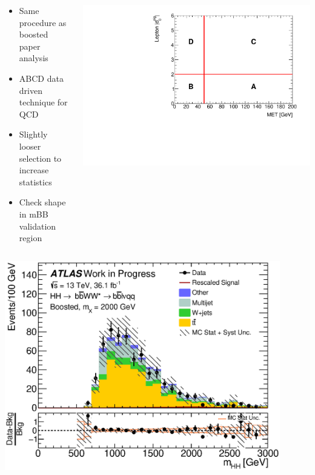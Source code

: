 \documentclass{beamer}
\newcommand*{\header}[1]{\fontsize{16}{8}\selectfont \textbf{{\color{MyPurple}{#1}}}}
\begin{document}
\begin{frame}
\begin{center}
\header{Background Modeling}
\end{center}
\begin{columns}
\begin{column}{0.5\textwidth}
\begin{itemize}
\item Same procedure as boosted paper analysis
\item ABCD data driven technique for QCD
\item Slightly looser selection to increase statistics
\item Check shape in mBB validation region
\end{itemize}
\end{column}
\begin{column}{0.5\textwidth}
\includegraphics[width=1\textwidth]{figures/ABCD}
\end{column}
\end{columns}
\end{frame}

\begin{frame}
\begin{center}
\header{Background Shape Check}
\end{center}
\begin{center}
\includegraphics[width=0.9\textwidth]{figures/C_2tag_mbbcr_lepton_presel_met50_hhMassRebin1}
\end{center}
\end{frame}
\end{document}
